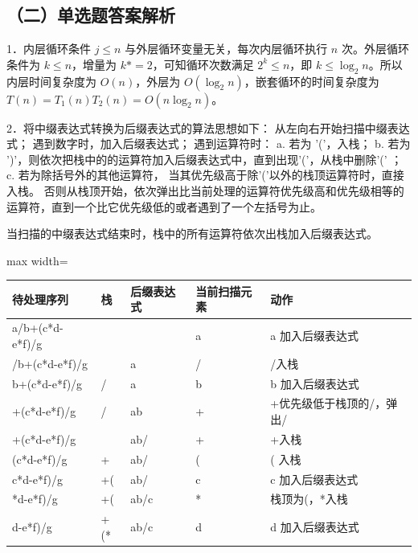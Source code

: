 \documentclass[UTF8,11pt]{ctexart}
\begin{document}
\subsection*{（二）单选题答案解析}

1．内层循环条件 \(\displaystyle j\le n\) 与外层循环变量无关，每次内层循环执行 \(\displaystyle n\) 次。外层循环条件为 \(\displaystyle k\le n\)，增量为 \(\displaystyle k\mathrel{*=}2\)，可知循环次数满足 \(\displaystyle 2^k\le n\)，即 \(\displaystyle k\le\log_2 n\)。所以内层时间复杂度为 \(\displaystyle O(n)\)，外层为 \(\displaystyle O(\log_2 n)\)，嵌套循环的时间复杂度为 \(\displaystyle T(n)=T_1(n)T_2(n)=O(n\log_2 n)\)。


2．将中缀表达式转换为后缀表达式的算法思想如下： 从左向右开始扫描中缀表达式； 遇到数字时，加入后缀表达式； 遇到运算符时： a. 若为 '('，入栈； b. 若为 ')'，则依次把栈中的的运算符加入后缀表达式中，直到出现'('，从栈中删除'(' ； c. 若为除括号外的其他运算符， 当其优先级高于除'('以外的栈顶运算符时，直接入栈。 否则从栈顶开始，依次弹出比当前处理的运算符优先级高和优先级相等的运算符，直到一个比它优先级低的或者遇到了一个左括号为止。


当扫描的中缀表达式结束时，栈中的所有运算符依次出栈加入后缀表达式。


\begin{center}\begin{adjustbox}{max width=\linewidth}\begin{tabular}{|>{\raggedright\arraybackslash}p{\dimexpr(\linewidth-10\tabcolsep-6\arrayrulewidth)/5\relax}|>{\raggedright\arraybackslash}p{\dimexpr(\linewidth-10\tabcolsep-6\arrayrulewidth)/5\relax}|>{\raggedright\arraybackslash}p{\dimexpr(\linewidth-10\tabcolsep-6\arrayrulewidth)/5\relax}|>{\raggedright\arraybackslash}p{\dimexpr(\linewidth-10\tabcolsep-6\arrayrulewidth)/5\relax}|>{\raggedright\arraybackslash}p{\dimexpr(\linewidth-10\tabcolsep-6\arrayrulewidth)/5\relax}|}\hline
待处理序列 & 栈 & 后缀表达式 & 当前扫描元素 & 动作\\\hline
a/b+(c*d-e*f)/g &  &  & a & a 加入后缀表达式\\\hline
/b+(c*d-e*f)/g &  & a & / & /入栈\\\hline
b+(c*d-e*f)/g & / & a & b & b 加入后缀表达式\\\hline
+(c*d-e*f)/g & / & ab & + & +优先级低于栈顶的/，弹出/\\\hline
+(c*d-e*f)/g &  & ab/ & + & +入栈\\\hline
(c*d-e*f)/g & + & ab/ & ( & ( 入栈\\\hline
c*d-e*f)/g & +( & ab/ & c & c 加入后缀表达式\\\hline
*d-e*f)/g & +( & ab/c & * & 栈顶为(，*入栈\\\hline
d-e*f)/g & +(* & ab/c & d & d 加入后缀表达式\\\hline\end{tabular}\end{adjustbox}\end{center}
\end{document}
